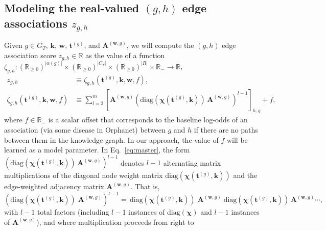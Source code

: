 \documentclass[11pt,notitlepage,english]{article}
\begin{document}
\subsection{Modeling the real-valued $(g,h)$ edge associations $z_{g,h}$}\label{sec:modelz}
Given $g \in G_T$, ${\boldsymbol k}$, ${\boldsymbol w}$,
${\boldsymbol t}^{(g)}$, and
${\boldsymbol A}^{({\boldsymbol w}, g)}$, we will compute the $(g,h)$ edge association score
$z_{g,h} \in {\mathbb R}$ as the value of a function
$\zeta_{g,h}:
{({\mathbb R}_{\geq 0})}^{|\alpha(g)|} \times
{({\mathbb R}_{\geq 0})}^{|C_T|} \times
{({\mathbb R}_{\geq 0})}^{|R|} \times
{\mathbb R}_{-} \rightarrow {\mathbb R}$,
\begin{align}
  z_{g,h} &\equiv \zeta_{g,h}({\boldsymbol t}^{(g)}, {\boldsymbol k}, {\boldsymbol w},
   f), \label{eq:defzgs} \\
 \zeta_{g,h}({\boldsymbol t}^{(g)}, {\boldsymbol k}, {\boldsymbol w},
      f)   & \equiv
      \sum\limits_{l = 2}^{m} {\left[
        {\boldsymbol A}^{({\boldsymbol w},g)}
          {\left(\textrm{diag}(
            \boldsymbol{\chi}({\boldsymbol t}^{(g)}, {\boldsymbol k})
            ) \, {\boldsymbol A}^{({\boldsymbol w},g)}
      \right)}^{l-1}\right]}_{h,g} + f, 
  \label{eq:master}
\end{align}
 where $f \in {\mathbb R}_{-}$ is a scalar offset that corresponds to the
 baseline log-odds of an association (via some disease in Orphanet) between $g$
 and $h$ if there are no paths between them in the knowledge graph. In our
 approach, the value of $f$ will be learned as a model parameter.  In
 Eq.~\ref{eq:master}, the form ${(\textrm{diag}(\boldsymbol{\chi}({\boldsymbol
     t}^{(g)}, {\boldsymbol k}) ) \, {\boldsymbol A}^{({\boldsymbol w},g)}
   )}^{l-1}$ denotes $l-1$ alternating matrix multiplications of the diagonal
 node weight matrix $\textrm{diag}(\boldsymbol{\chi}({\boldsymbol t}^{(g)},
 {\boldsymbol k}))$ and the edge-weighted adjacency matrix ${\boldsymbol
   A}^{({\boldsymbol w},g)}$.  That is,
\begin{equation}
{\left(\textrm{diag}(\boldsymbol{\chi}({\boldsymbol t}^{(g)}, {\boldsymbol k}) )
  \; {\boldsymbol A}^{({\boldsymbol w},g)} \right)}^{l-1} = \,
\textrm{diag}(\boldsymbol{\chi}({\boldsymbol t}^{(g)}, {\boldsymbol k})) \;
  {\boldsymbol A}^{({\boldsymbol w},g)} \;
  \textrm{diag}(\boldsymbol{\chi}({\boldsymbol t}^{(g)}, {\boldsymbol k}))
    \, {\boldsymbol A}^{({\boldsymbol w},g)} \cdots,
\end{equation}
with $l-1$ total factors (including $l-1$ instances of
$\textrm{diag}(\boldsymbol{\chi})$ and $l-1$ instances of ${\boldsymbol
  A}^{({\boldsymbol w},g)}$), and where multiplication proceeds from right to
\end{document}
